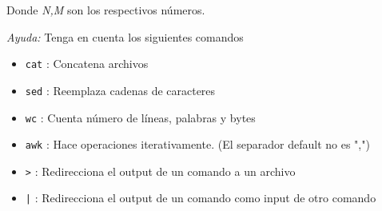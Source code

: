 \documentclass[11pt,letterpaper]{exam}
\begin{document}
\begin{questions}
Donde \textit{N,M} son los respectivos n\'umeros.

\textit{Ayuda:} Tenga en cuenta los siguientes comandos

\begin{itemize}
\item \verb"cat" : Concatena archivos
\item \verb"sed" : Reemplaza cadenas de caracteres
\item \verb"wc"  : Cuenta n\'umero de l\'ineas, palabras y bytes
\item \verb"awk" : Hace operaciones iterativamente. (El separador default no es ",")
\item \verb">"   : Redirecciona el output de un comando a un archivo
\item \verb"|"   : Redirecciona el output de un comando como input de otro comando
\end{itemize}


\end{questions}
\end{document}
